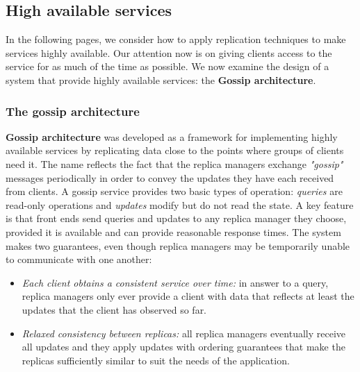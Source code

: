 \subsection{High available services}
In the following pages, we consider how to apply replication techniques to make services highly available. Our attention now is on giving clients access to the service for as much of the time as possible. We now examine the design of a system that provide highly available services: the \textbf{Gossip architecture}.

\subsubsection{The gossip architecture}
\textbf{Gossip architecture} was developed as a framework for implementing highly available services by replicating data close to the points where groups of clients need it. The name reflects the fact that the replica managers exchange \textit{"gossip"} messages periodically in order to convey the updates they have each received from clients.
A gossip service provides two basic types of operation: \textit{queries} are read-only operations and \textit{updates} modify but do not read the state. A key feature is that front ends send queries and updates to any replica manager they choose, provided it is available and can provide reasonable response times. The system makes two guarantees, even though replica managers may be temporarily unable to communicate with one another:
\begin{itemize}
	\item \textit{Each client obtains a consistent service over time:} in answer to a query, replica managers only ever provide a client with data that reflects at least the updates that the client has observed so far.
	\item \textit{Relaxed consistency between replicas:} all replica managers eventually receive all updates and they apply updates with ordering guarantees that make the replicas sufficiently similar to suit the needs of the application.
\end{itemize}

